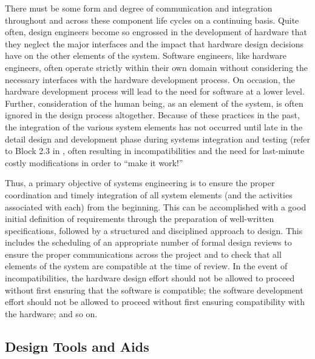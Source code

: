 There must be some form and degree of communication and integration throughout and across these component life cycles on a continuing basis. Quite often, design engineers become so engrossed in the development of hardware that they neglect the major interfaces and the impact that hardware design decisions have on the other elements of the system. Software engineers, like hardware engineers, often operate strictly within their own domain without considering the necessary interfaces with the hardware development process. On occasion, the hardware development process will lead to the need for software at a lower level. Further, consideration of the human being, as an element of the system, is often ignored in the design process altogether. Because of these practices in the past, the integration of the various system elements has not occurred until late in the detail design and development phase during systems integration and testing (refer to Block 2.3 in , often resulting in incompatibilities and the need for last-minute costly modifications in order to ``make it work!''

Thus, a primary objective of systems engineering is to ensure the proper coordination and timely integration of all system elements (and the activities associated with each) from the beginning. This can be accomplished with a good initial definition of requirements through the preparation of well-written specifications, followed by a structured and disciplined approach to design. This includes the scheduling of an appropriate number of formal design reviews to ensure the proper communications across the project and to check that all elements of the system are compatible at the time of review. In the event of incompatibilities, the hardware design effort should not be allowed to proceed without first ensuring that the software is compatible; the software development effort should not be allowed to proceed without first ensuring compatibility with the hardware; and so on.

\subsection{Design Tools and Aids}

